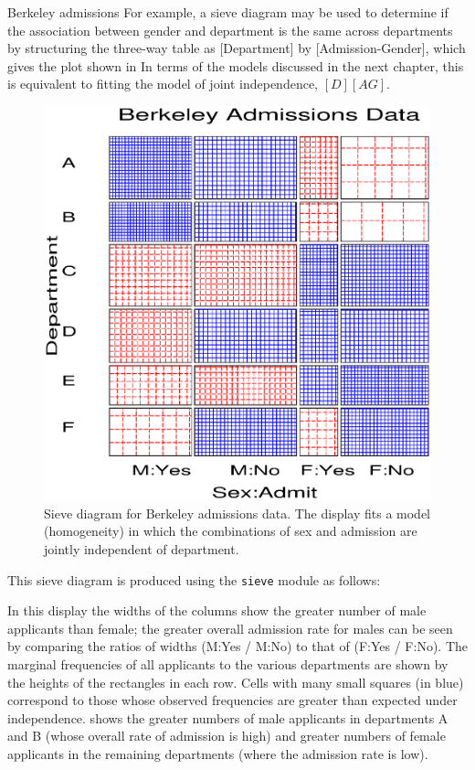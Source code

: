 \begin{Example}[berkeley3]{Berkeley admissions}
For example, a sieve diagram may be used to determine if the association
between gender and department is the same across departments
by structuring the three-way table as [Department] by [Admission-Gender],
which gives the plot shown in 
In terms of the \loglin{} models discussed in
the next chapter, this is equivalent to fitting the model
of joint independence, $[D] [AG]$.

\begin{figure}[htb]
  \centering
  \includegraphics[scale=.5]{ch3/fig/sievebrk}
  \caption[Sieve diagram for Berkeley admissions data]{Sieve diagram for Berkeley admissions data.  The display fits a model (homogeneity) in which the combinations of sex and admission are jointly independent of department.}\label{fig:sievebrk}
\end{figure}

This sieve diagram is produced using the \texttt{sieve} module
as follows:

In this display the widths of the columns show the greater number of
male applicants than female; the greater overall admission rate for
males can be seen by comparing the ratios of widths (M:Yes / M:No) to
that of (F:Yes / F:No).
The marginal frequencies of all applicants to the various departments
are shown by the heights of the rectangles in each row.
Cells with many small squares (in blue)
correspond to those whose observed frequencies are greater than
expected under
independence.   shows the greater numbers of
male applicants in departments A and B
(whose overall rate of admission is high) and greater numbers of female
applicants in the remaining departments (where the admission rate is low).
\end{Example}
